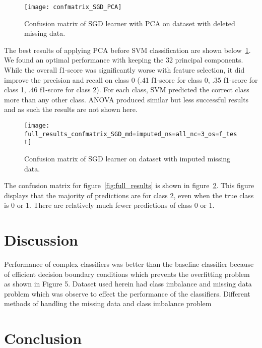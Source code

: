 \documentclass[conference]{IEEEtran}
\begin{document}
\begin{figure}[htpb]
	\centering
	\texttt{[image: confmatrix\_SGD\_PCA]}
	\caption{Confusion matrix of SGD learner with PCA on dataset with deleted missing data.}
	\label{fig:sgd_pca_results}
\end{figure}

The best results of applying PCA before SVM classification are shown below~\ref{fig:sgd_pca_results}. We found an optimal performance with keeping the 32 principal components. While the overall f1-score was significantly worse with feature selection, it did improve the precision and recall on class 0 (.41 f1-score for class 0, .35 f1-score for class 1, .46 f1-score for class 2). For each class, SVM predicted the correct class more than any other class. ANOVA produced similar but less successful results and as such the results are not shown here.

\begin{figure}[htpb]
	\centering
	\texttt{[image: full\_results\_confmatrix\_SGD\_md=imputed\_ns=all\_nc=3\_os=f\_test]}
	\caption{Confusion matrix of SGD learner on dataset with imputed missing data.}
	\label{fig:full_results_cm}
\end{figure}

The confusion matrix for figure~\ref{fig:full_results} is shown in figure~\ref{fig:full_results_cm}. This figure displays that the majority of predictions are for class 2, even when the true class is 0 or 1. There are relatively much fewer predictions of class 0 or 1.

\section{Discussion}

Performance of complex classifiers was better than the baseline classifier because of efficient decision boundary conditions which prevents the overfitting problem as shown in Figure 5. Dataset used herein had class imbalance and missing data problem which was observe to effect the performance of the classifiers. Different methods of handling the missing data and class imbalance problem 

\section{Conclusion}
\end{document}
